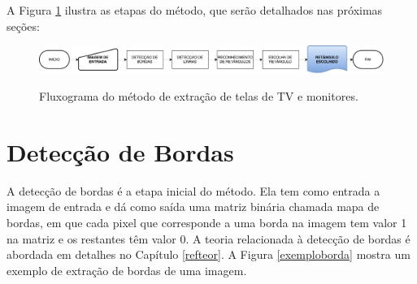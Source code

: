 A Figura \ref{testefigura} ilustra as etapas do método, que serão detalhados nas próximas seções:



\begin{figure} [h]
\centering
\includegraphics[width = \textwidth]{figuras/diaginicial.pdf} \label{testefigura}
\caption{Fluxograma do método de extração de telas de TV e monitores.}
\end{figure}

\section{Detecção de Bordas} \label{met:borda}


A detecção de bordas é a etapa inicial do método. Ela tem como entrada a imagem de entrada e dá como saída uma matriz binária chamada mapa de bordas, em que cada pixel que corresponde a uma borda na imagem tem valor 1 na matriz e os restantes têm valor 0. A teoria relacionada à detecção de bordas é abordada em detalhes no Capítulo \ref{refteor}. A Figura \ref{exemploborda} mostra um exemplo de extração de bordas de uma imagem.




